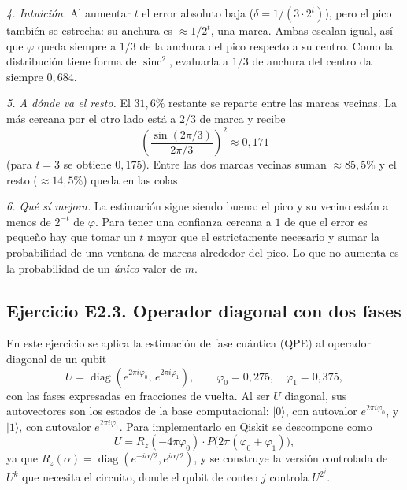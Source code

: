 \medskip
\noindent\textit{4. Intuición.} Al aumentar $t$ el error absoluto baja
($\delta = 1/(3\cdot 2^t)$), pero el pico también se estrecha: su anchura es $\approx 1/2^t$,
una marca. Ambas escalan igual, así que $\varphi$ queda siempre a $1/3$ de la anchura del pico
respecto a su centro. Como la distribución tiene forma de $\operatorname{sinc}^2$, evaluarla a
$1/3$ de anchura del centro da siempre $0{,}684$.

\medskip
\noindent\textit{5. A dónde va el resto.} El $31{,}6\%$ restante se reparte entre las marcas
vecinas. La más cercana por el otro lado está a $2/3$ de marca y recibe
\begin{equation*}
  \left(\frac{\sin(2\pi/3)}{2\pi/3}\right)^{2} \approx 0{,}171
\end{equation*}
(para $t=3$ se obtiene $0{,}175$). Entre las dos marcas vecinas suman $\approx 85{,}5\%$ y
el resto ($\approx 14{,}5\%$) queda en las colas.

\medskip
\noindent\textit{6. Qué sí mejora.} La estimación sigue siendo buena: el pico y su vecino
están a menos de $2^{-t}$ de $\varphi$. Para tener una confianza cercana a $1$ de que el error
es pequeño hay que tomar un $t$ mayor que el estrictamente necesario y sumar la probabilidad de
una ventana de marcas alrededor del pico. Lo que no aumenta es la probabilidad de un
\emph{único} valor de $m$.



\subsection{Ejercicio E2.3. Operador diagonal con dos fases}
En este ejercicio se aplica la estimación de fase cuántica (QPE) al operador diagonal de un qubit
\begin{equation*}
  U = \operatorname{diag}\!\left(e^{2\pi i\varphi_0},\, e^{2\pi i\varphi_1}\right),
  \qquad \varphi_0 = 0{,}275, \quad \varphi_1 = 0{,}375,
\end{equation*}
con las fases expresadas en fracciones de vuelta. Al ser $U$ diagonal, sus autovectores son los
estados de la base computacional: $|0\rangle$, con autovalor $e^{2\pi i\varphi_0}$, y
$|1\rangle$, con autovalor $e^{2\pi i\varphi_1}$. Para implementarlo en Qiskit se descompone como
\begin{equation*}
  U = R_z(-4\pi\varphi_0)\cdot P\big(2\pi(\varphi_0+\varphi_1)\big),
\end{equation*}
ya que $R_z(\alpha) = \operatorname{diag}(e^{-i\alpha/2}, e^{i\alpha/2})$, y se construye la
versión controlada de $U^{k}$ que necesita el circuito, donde el qubit de conteo $j$ controla
$U^{2^j}$.

